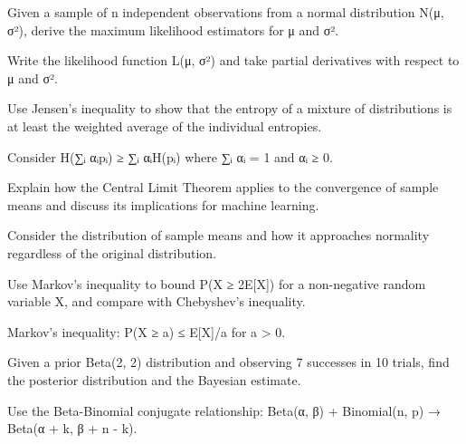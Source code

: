 \begin{exercisebox}[medium]
\begin{problem}
Given a sample of n independent observations from a normal distribution N(μ, σ²), derive the maximum likelihood estimators for μ and σ².
\end{problem}
\begin{hintbox}
Write the likelihood function L(μ, σ²) and take partial derivatives with respect to μ and σ².
\end{hintbox}
\end{exercisebox}


\begin{exercisebox}[medium]
\begin{problem}
Use Jensen's inequality to show that the entropy of a mixture of distributions is at least the weighted average of the individual entropies.
\end{problem}
\begin{hintbox}
Consider H(∑ᵢ αᵢpᵢ) ≥ ∑ᵢ αᵢH(pᵢ) where ∑ᵢ αᵢ = 1 and αᵢ ≥ 0.
\end{hintbox}
\end{exercisebox}


\begin{exercisebox}[medium]
\begin{problem}
Explain how the Central Limit Theorem applies to the convergence of sample means and discuss its implications for machine learning.
\end{problem}
\begin{hintbox}
Consider the distribution of sample means and how it approaches normality regardless of the original distribution.
\end{hintbox}
\end{exercisebox}


\begin{exercisebox}[medium]
\begin{problem}
Use Markov's inequality to bound P(X ≥ 2E[X]) for a non-negative random variable X, and compare with Chebyshev's inequality.
\end{problem}
\begin{hintbox}
Markov's inequality: P(X ≥ a) ≤ E[X]/a for a > 0.
\end{hintbox}
\end{exercisebox}


\begin{exercisebox}[medium]
\begin{problem}
Given a prior Beta(2, 2) distribution and observing 7 successes in 10 trials, find the posterior distribution and the Bayesian estimate.
\end{problem}
\begin{hintbox}
Use the Beta-Binomial conjugate relationship: Beta(α, β) + Binomial(n, p) → Beta(α + k, β + n - k).
\end{hintbox}
\end{exercisebox}


